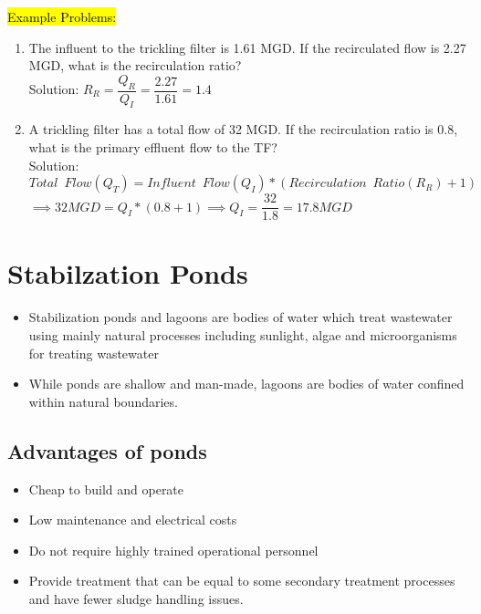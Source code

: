 \hl{Example Problems:}\\
\begin{enumerate}
\item The influent to the trickling filter is 1.61 MGD. If the recirculated flow is 2.27 MGD, what is the recirculation ratio?\\
\vspace{0.2cm}
Solution:  $R_R=\dfrac{Q_R}{Q_I}=\dfrac{2.27}{1.61}=\boxed{1.4}$\\
\vspace{0.2cm}
\item A trickling filter has a total flow of 32 MGD.  If the recirculation ratio is 0.8, what is the primary effluent flow to the TF?\\
\vspace{0.2cm}
Solution:\\
\vspace{0.2cm}
$Total \enspace Flow (Q_T) = Influent \enspace Flow (Q_I)*(Recirculation \enspace Ratio(R_R) +1)$\\
$\implies 32 MGD=Q_I*(0.8+1)\implies Q_I=\dfrac{32}{1.8}=\boxed{17.8 MGD}$
\end{enumerate}
\newpage



\chapter{Stabilzation Ponds}

\begin{itemize}
\item Stabilization ponds and lagoons are bodies of water which treat wastewater using mainly natural processes including sunlight, algae and microorganisms for treating wastewater\\
\item While ponds are shallow and man-made, lagoons are bodies of water confined within natural boundaries.\\
\end{itemize}


\section{Advantages of ponds}	

\begin{itemize}	
\item Cheap to build and operate
\item Low maintenance and electrical costs
\item Do not require highly trained operational personnel
\item Provide treatment that can be equal to some secondary treatment processes and have fewer sludge handling issues.\\
\end{itemize}


